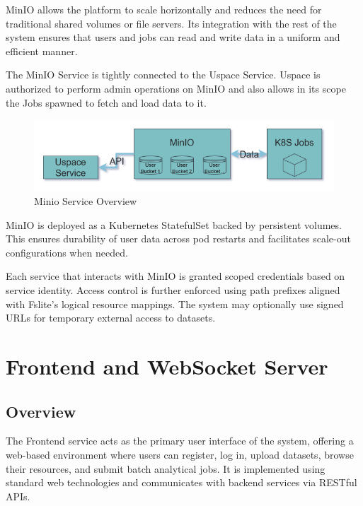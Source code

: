 MinIO allows the platform to scale horizontally and reduces the need for traditional shared volumes or file servers. Its integration with 
the rest of the system ensures that users and jobs can read and write data in a uniform and efficient manner.

The MinIO Service is tightly connected to the Uspace Service. Uspace is authorized to perform admin operations on MinIO and also 
allows in its scope the Jobs spawned to fetch and load data to it.

\begin{figure}[h!]
  \centering
  \includegraphics[width=1\textwidth]{Images/minio-overview.png}
  \caption{Minio Service Overview}
  \label{fig:minio-overview}
\end{figure}


MinIO is deployed as a Kubernetes StatefulSet backed by persistent volumes. This ensures durability of user data across pod restarts and facilitates scale-out configurations when needed.

Each service that interacts with MinIO is granted scoped credentials based on service identity. Access control is further enforced using path prefixes aligned with Fslite’s logical resource mappings. The system may optionally use signed URLs for temporary external access to datasets.



\section{Frontend and WebSocket Server}
\label{sec:frontend-wss}

\subsection{Overview}

The Frontend service acts as the primary user interface of the system, offering a web-based environment where users can register, log in, upload datasets, browse their resources, and submit batch analytical jobs. It is implemented using standard web technologies and communicates with backend services via RESTful APIs.

